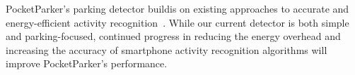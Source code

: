 PocketParker's parking detector buildis on existing approaches to accurate
and energy-efficient activity recognition~\cite{Constandache:2010:DYS,
Keally:2011:PTP, Reddy:2010:UMP, Yang:2011:DDP, Wang:2009:FEE}. While our
current detector is both simple and parking-focused, continued progress in
reducing the energy overhead and increasing the accuracy of smartphone
activity recognition algorithms will improve PocketParker's performance.
